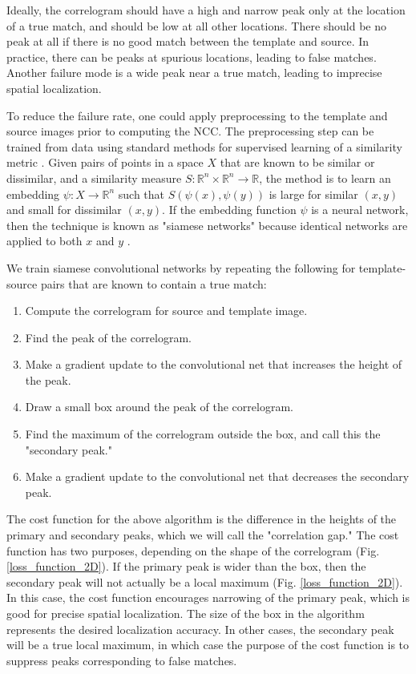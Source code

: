 \documentclass{article}
\begin{document}
Ideally, the correlogram should have a high and narrow peak only at the location of a true match, and should be low at all other locations. There should be no peak at all if there is no good match between the template and source. In practice, there can be peaks at spurious locations, leading to false matches. Another failure mode is a wide peak near a true match, leading to imprecise spatial localization.

To reduce the failure rate, one could apply preprocessing to the template and source images prior to computing the NCC. The preprocessing step can be trained from data using standard methods for supervised learning of a similarity metric \cite{kulis2013metric, yang2006distance}. Given pairs of points in a space $X$ that are known to be similar or dissimilar, and a similarity measure $S:\mathbb{R}^n\times\mathbb{R}^n\to \mathbb{R}$, the method is to learn an embedding $\psi:X\rightarrow \mathbb{R}^n$ such that $S(\psi(x),\psi(y))$ is large for similar $(x,y)$ and small for dissimilar $(x,y)$. If the embedding function $\psi$ is a neural network, then the technique is known as "siamese networks"\cite{bromley1993signature} because identical networks are applied to both $x$ and $y$ \cite{chopra2005learning}. 





We train siamese convolutional networks by repeating the following for template-source pairs that are known to contain a true match:
\begin{enumerate}
\item Compute the correlogram for source and template image. 
\item Find the peak of the correlogram. 
\item Make a gradient update to the convolutional net that increases the height of the peak. 
\item Draw a small box around the peak of the correlogram.
\item Find the maximum of the correlogram outside the box, and call this the "secondary peak."
\item Make a gradient update to the convolutional net that decreases the secondary peak.
\end{enumerate}
The cost function for the above algorithm is the difference in the heights of the primary and secondary peaks, which we will call the "correlation gap." The cost function has two purposes, depending on the shape of the correlogram (Fig. \ref{loss_function_2D}). If the primary peak is wider than the box, then the secondary peak will not actually be a local maximum (Fig. \ref{loss_function_2D}). In this case, the cost function encourages narrowing of the primary peak, which is good for precise spatial localization. The size of the box in the algorithm represents the desired localization accuracy. In other cases, the secondary peak will be a true local maximum, in which case the purpose of the cost function is to suppress peaks corresponding to false matches. 
\end{document}
